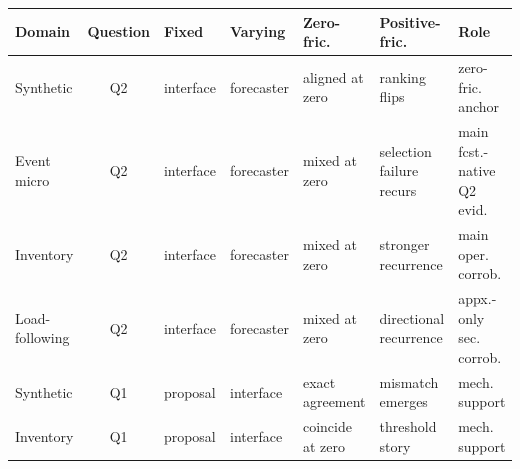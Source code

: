 \begin{tabularx}{\columnwidth}{@{}l c l l >{\raggedright\arraybackslash}X >{\raggedright\arraybackslash}X >{\raggedright\arraybackslash}X@{}}
\toprule
Domain & Question & Fixed & Varying & Zero-fric. & Positive-fric. & Role \\
\midrule
Synthetic & Q2 & interface & forecaster & aligned at zero & ranking flips & zero-fric. anchor \\
Event micro & Q2 & interface & forecaster & mixed at zero & selection failure recurs & main fcst.-native Q2 evid. \\
Inventory & Q2 & interface & forecaster & mixed at zero & stronger recurrence & main oper. corrob. \\
Load-following & Q2 & interface & forecaster & mixed at zero & directional recurrence & appx.-only sec. corrob. \\
Synthetic & Q1 & proposal & interface & exact agreement & mismatch emerges & mech. support \\
Inventory & Q1 & proposal & interface & coincide at zero & threshold story & mech. support \\
\bottomrule
\end{tabularx}
